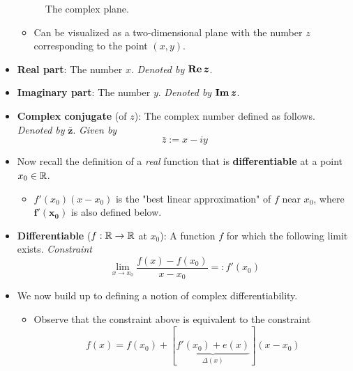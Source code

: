\documentclass[../notes.tex]{subfiles}
\begin{document}
\begin{itemize}
\begin{figure}[h!]
        \caption{The complex plane.}
        \label{fig:complexPlane}
    \end{figure}
    \vspace{-0.4em}
    \begin{itemize}
        \item Can be visualized as a two-dimensional plane with the number $z$ corresponding to the point $(x,y)$.
    \end{itemize}
    \item \textbf{Real part}: The number $x$. \emph{Denoted by} $\bm{\re z}$.
    \item \textbf{Imaginary part}: The number $y$. \emph{Denoted by} $\bm{\im z}$.
    \item \textbf{Complex conjugate} (of $z$): The complex number defined as follows. \emph{Denoted by} $\bm{\bar{z}}$. \emph{Given by}
    \begin{equation*}
        \bar{z} := x-iy
    \end{equation*}
    \item Now recall the definition of a \emph{real} function that is \textbf{differentiable} at a point $x_0\in\mathbb{R}$.
    \begin{itemize}
        \item $f'(x_0)(x-x_0)$ is the "best linear approximation" of $f$ near $x_0$, where $\bm{f'(x_0)}$ is also defined below.
    \end{itemize}
    \item \textbf{Differentiable} ($f:\mathbb{R}\to\mathbb{R}$ at $x_0$): A function $f$ for which the following limit exists. \emph{Constraint}
    \begin{equation*}
        \lim_{x\to x_0}\frac{f(x)-f(x_0)}{x-x_0} =: f'(x_0)
    \end{equation*}
    \item We now build up to defining a notion of complex differentiability.
    \begin{itemize}
        \item Observe that the constraint above is equivalent to the constraint
        \begin{equation*}
            f(x) = f(x_0)+[\underbrace{f'(x_0)+e(x)}_{\Delta(x)}](x-x_0)

\end{equation*}
\end{itemize}
\end{itemize}
\end{document}
